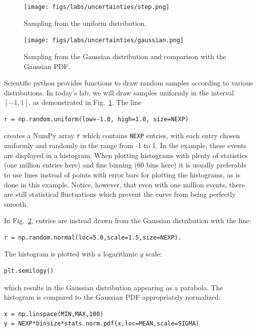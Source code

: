 \begin{figure}[htbp]
\begin{center}
\texttt{[image: figs/labs/uncertainties/step.png]}\\
\end{center}
\caption{\label{fig:samplingstep} Sampling from the uniform distribution. }
\end{figure}

\begin{figure}[htbp]
\begin{center}
\texttt{[image: figs/labs/uncertainties/gaussian.png]}\\ 
\end{center}
\caption{\label{fig:samplinggauss} Sampling from the Gaussian distribution and comparison with the Gaussian PDF.}
\end{figure}

Scientific python provides functions to draw random samples according
to various distributions.  In today's lab, we will draw samples
uniformly in the interval $[-1,1]$, as demonstrated in Fig.~\ref{fig:samplingstep}.   The line
\begin{verbatim}
r = np.random.uniform(low=-1.0, high=1.0, size=NEXP)
\end{verbatim}
creates a NumPy array {\tt r} which contains {\tt NEXP} entries, with
each entry chosen uniformly and randomly in the range from -1 to 1.
In the example, these events are displayed in a histogram.  When
plotting histograms with plenty of statistics (one million entries
here) and fine binning (60 bins here) it is usually preferable to use
lines instead of points with error bars for plotting the histograms,
as is done in this example.  Notice, however, that even with one
million events, there are still statistical fluctuations which prevent
the curve from being perfectly smooth.

In Fig.~\ref{fig:samplinggauss}, entries are instead drawn from the Gaussian distribution with the line:
\begin{verbatim}
r = np.random.normal(loc=5.0,scale=1.5,size=NEXP).
\end{verbatim}
The histogram is plotted with a logarithmic $y$ scale:
\begin{verbatim}
plt.semilogy()
\end{verbatim}
which results in the Gaussian distribution appearing as a parabola.  The histogram is compared to the Gaussian PDF appropriately normalized:
\begin{verbatim}
x = np.linspace(MIN,MAX,100)
y = NEXP*binsize*stats.norm.pdf(x,loc=MEAN,scale=SIGMA)
\end{verbatim}


